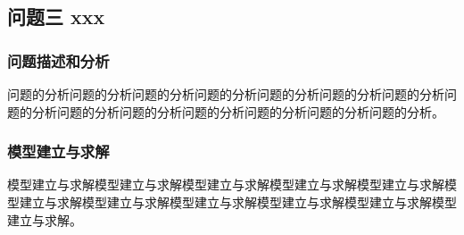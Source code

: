 \subsection{问题三 xxx}
\subsubsection{问题描述和分析}
问题的分析问题的分析问题的分析问题的分析问题的分析问题的分析问题的分析问题的分析问题的分析问题的分析问题的分析问题的分析问题的分析问题的分析。
\subsubsection{模型建立与求解}
模型建立与求解模型建立与求解模型建立与求解模型建立与求解模型建立与求解模型建立与求解模型建立与求解模型建立与求解模型建立与求解模型建立与求解模型建立与求解。
